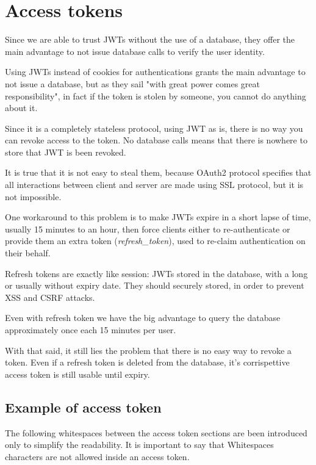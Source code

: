 \section{Access tokens}
Since we are able to trust JWTs  without the use of a database, they offer the
main advantage to not issue database calls to verify the user identity.


Using JWTs instead of cookies for authentications grants the main advantage to
not issue a database, but as they sail "with great power comes great
responsibility", in fact if the token is stolen by someone, you cannot do
anything about it.

Since it is a completely stateless protocol, using JWT as is, there is no way
you can revoke access to the token. No database calls means that there is
nowhere to store that JWT is been revoked.

It is true that it is not easy to steal them, because OAuth2 protocol specifies
that all interactions between client and server are made using SSL protocol, but
it is not impossible.

One workaround to this problem is to make JWTs expire in a short lapse of time,
usually 15 minutes to an hour, then force clients either to re-authenticate or
provide them an extra token (\textit{refresh\_token}), used to re-claim
authentication on their behalf.

Refresh tokens are exactly like session: JWTs stored in the database, with a
long or usually without expiry date.
They should securely stored, in order to prevent XSS and CSRF attacks.

Even with refresh token we have the big advantage to query the database
approximately once each 15 minutes per user.

With that said, it still lies the problem that there is no easy way to revoke a
token. Even if a refresh token is deleted from the database, it's corrispettive
access token is still usable until expiry.

\subsection{Example of access token}
The following whitespaces between the access token sections are been introduced
only to simplify the readability.
It is important to say that Whitespaces characters are not allowed inside an
access token.

